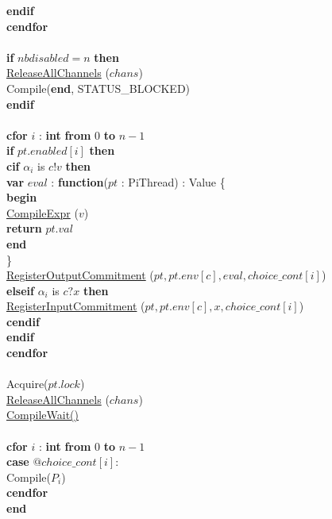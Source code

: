 \documentclass[a4paper,11pt]{article}
\newenvironment{program}{
  \begin{sffamily}
  \begin{scriptsize}
  \begin{tabbing}}
 {\end{tabbing}
  \end{scriptsize}
  \end{sffamily}}
\newcommand{\kw}[1]{\textsf{\textbf{#1}}}
\newcommand{\pindent}{\hspace{2em}\=}
\newcommand{\compiletime}[1]{\textcolor{compilecolor}{#1}}
\newcommand{\synchro}[1]{\textcolor{synchrocolor}{#1}}
\newcommand{\myref}[1]{
  \hyperref[#1]{#1}
}
\begin{document}
\begin{program}
  \>\>\kw{endif} \\
  \>\compiletime{\kw{cendfor}} \\
  \>\\
  \>\kw{if} $nbdisabled = n$ \kw{then} \\
  \>\pindent\synchro{\myref{ReleaseAllChannels}($chans$)} \\
  \>\>\compiletime{Compile(\kw{end}, STATUS\_BLOCKED)} \\
  \>\kw{endif} \\
  \>\\
  \>\compiletime{\kw{cfor} $i$ : \kw{int} \kw{from} $0$ \kw{to} $n-1$} \\
  \>\pindent\kw{if} $pt.enabled[i]$ \kw{then} \\
  \>\>\pindent\compiletime{\kw{cif} $\alpha_i$ is $c!v$ \kw{then}} \\
  \>\>\>\pindent\kw{var} $eval$ : \kw{function}($pt$ : PiThread) : Value \{ \\
  \>\>\>\>\pindent\kw{begin} \\
  \>\>\>\>\>\pindent\compiletime{\myref{CompileExpr}($v$)} \\
  \>\>\>\>\>\>\kw{return} $pt.val$ \\
  \>\>\>\>\>\kw{end} \\
  \>\>\>\>\} \\
  \>\>\>\>\myref{RegisterOutputCommitment}($pt, pt.env[c], eval, choice\_cont[i]$) \\
  \>\>\>\compiletime{\kw{elseif} $\alpha_i$ is $c?x$ \kw{then}} \\
  \>\>\>\pindent\myref{RegisterInputCommitment}($pt, pt.env[c], x, choice\_cont[i]$) \\
  \>\>\>\compiletime{\kw{cendif}} \\
  \>\>\kw{endif} \\
  \>\compiletime{\kw{cendfor}} \\
  \>\\
  \>\synchro{Acquire($pt.lock$)} \\
  \>\synchro{\myref{ReleaseAllChannels}($chans$)} \\
  \>\compiletime{\myref{CompileWait()}} \\
  \>\\
  \>\compiletime{\kw{cfor} $i$ : \kw{int} \kw{from} $0$ \kw{to} $n-1$} \\
  \>\pindent \kw{case} $@choice\_cont[i]:$ \\
  \>\>\compiletime{Compile($P_i$)} \\
  \>\compiletime{\kw{cendfor}} \\
  \kw{end}
\end{program}
\end{document}
